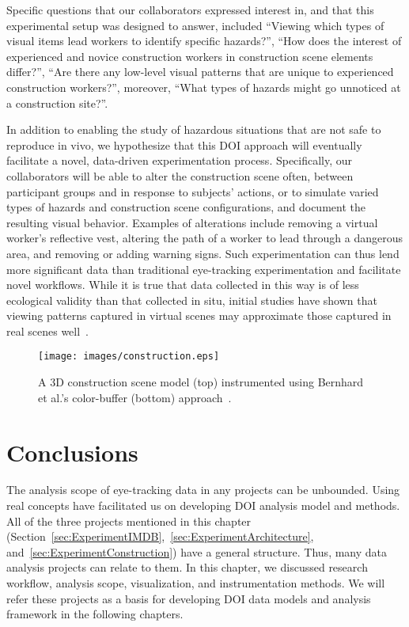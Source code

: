 Specific questions that our collaborators expressed interest in, and that this experimental setup was designed to answer, included ``Viewing which types of visual items lead workers to identify specific hazards?'', ``How does the interest of experienced and novice construction workers in construction scene elements differ?'', ``Are there any low-level visual patterns that are unique to experienced construction workers?'', moreover, ``What types of hazards might go unnoticed at a construction site?''.

In addition to enabling the study of hazardous situations that are not safe to reproduce in vivo, we hypothesize that this DOI approach will eventually facilitate a novel, data-driven experimentation process. Specifically, our collaborators will be able to alter the construction scene often, between participant groups and in response to subjects' actions, or to simulate varied types of hazards and construction scene configurations, and document the resulting visual behavior. Examples of alterations include removing a virtual worker's reflective vest, altering the path of a worker to lead through a dangerous area, and removing or adding warning signs. Such experimentation can thus lend more significant data than traditional eye-tracking experimentation and facilitate novel workflows. While it is true that data collected in this way is of less ecological validity than that collected in situ, initial studies have shown that viewing patterns captured in virtual scenes may approximate those captured in real scenes well~\cite{nipesh}.

\begin{figure}[htbp]
  \centering
  \texttt{[image: images/construction.eps]}
  \caption{A 3D construction scene model (top) instrumented using Bernhard et al.'s color-buffer (bottom) approach~\cite{Bern14}. }
	\label{fig:construction}
\end{figure}

\section{Conclusions}
The analysis scope of eye-tracking data in any projects can be unbounded. Using real concepts have facilitated us on developing DOI analysis model and methods. All of the three projects mentioned in this chapter (Section~\ref{sec:ExperimentIMDB},~\ref{sec:ExperimentArchitecture}, and~\ref{sec:ExperimentConstruction}) have a general structure. Thus, many data analysis projects can relate to them. In this chapter, we discussed research workflow, analysis scope, visualization, and instrumentation methods. We will refer these projects as a basis for developing DOI data models and analysis framework in the following chapters. 